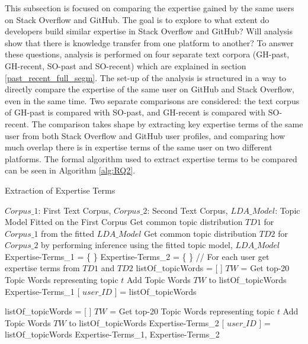        This subsection is focused on comparing the expertise gained by the same users on Stack Overflow and GitHub. The goal is to explore to what extent do developers build similar expertise in Stack Overflow and GitHub? Will analysis show that there is knowledge transfer from one platform to another? To answer these questions, analysis is performed on four separate text corpora (GH-past, GH-recent, SO-past and SO-recent) which are explained in section \ref{past_recent_full_segm}. The set-up of the analysis is structured in a way to directly compare the expertise of the same user on GitHub and Stack Overflow, even in the same time. Two separate comparisons are considered: the text corpus of GH-past is compared with SO-past, and GH-recent is compared with SO-recent. The comparison takes shape by extracting key expertise terms of the same user from both Stack Overflow and GitHub user profiles, and comparing how much overlap there is in expertise terms of the same user on two different platforms. The formal algorithm used to extract expertise terms to be compared can be seen in Algorithm \ref{alg:RQ2}.
        
        \begin{algorithm}
            \caption{Extraction of Expertise Terms}
            \label{alg:RQ2}
            \begin{algorithmic}[1]
                \REQUIRE $Corpus\_1$: First Text Corpus, $Corpus\_2$: Second Text Corpus, $LDA\_Model$: Topic Model Fitted on the First Corpus
                \STATE Get common topic distribution $TD1$ for $Corpus\_1$ from the fitted $LDA\_Model$
                \STATE Get common topic distribution $TD2$ for $Corpus\_2$ by performing inference using the fitted topic model, $LDA\_Model$
                \STATE Expertise-Terms\_1 = \{ \}
                \STATE Expertise-Terms\_2 = \{ \}
                \STATE
                \STATE // For each user get expertise terms from $TD1$ and $TD2$ 
                    \STATE listOf\_topicWords = [ ]
                        \STATE $TW$ = Get top-20 Topic Words representing topic $t$
                        \STATE Add Topic Words $TW$ to listOf\_topicWords 
                    \ENDFOR
                    \STATE Expertise-Terms\_1 [ $user\_ID$ ] = listOf\_topicWords
                    \STATE
                    
                    \STATE listOf\_topicWords = [ ]
                        \STATE $TW$ = Get top-20 Topic Words representing topic $t$
                        \STATE Add Topic Words $TW$ to listOf\_topicWords 
                    \ENDFOR
                    \STATE Expertise-Terms\_2 [ $user\_ID$ ] = listOf\_topicWords
                    \STATE
                \ENDFOR
                \RETURN Expertise-Terms\_1, Expertise-Terms\_2
            \end{algorithmic}
        \end{algorithm}
        
